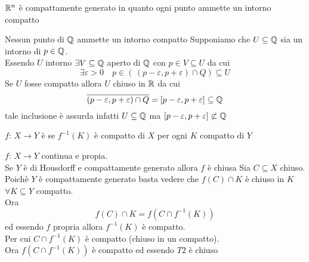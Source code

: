 \begin{oss}$\mathbb{R}^n$ \`e compattamente generato in quanto ogni punto ammette un intorno compatto
\end{oss}
\begin{ex}Nessun punto di $\mathbb{Q}$ ammette un intorno compatto
\proof Supponiamo che $U \subseteq \mathbb{Q} $ sia un intorno di $p\in \mathbb{Q}$.\\
Essendo $U$ intorno $\exists V\subseteq \mathbb{Q}$ aperto di $\mathbb{Q}$ con $p\in V \subseteq U $ da cui 
$$ \exists \varepsilon>0 \quad p \in \left( \, (p-\varepsilon, p+\varepsilon) \cap Q \right) \subseteq U$$
Se $U$ fosse compatto allora $U$ chiuso in $\mathbb{R}$ da cui 
$$\overline{(p-\varepsilon, p+\varepsilon) \cap Q } = [p-\varepsilon,p+\varepsilon] \subseteq \mathbb{Q}$$
tale inclusione \`e assurda infatti $U \subseteq \mathbb{Q} $ ma $[p-\varepsilon , p+\varepsilon ] \not \subset \mathbb{Q}$
\end{ex}
\spazio
\begin{defn}$f:\, X\to Y$ \`e  se $f^{-1}(K)$ \`e compatto di $X$ per ogni $K$ compatto di $Y$
\end{defn}
\begin{thm}$f:\, X \to Y$ continua e propia.\\
Se $Y$ \`e di Housdorff e compattamente generato allora $f$ \`e chiusa
\proof Sia $C\subseteq X $ chiuso.\\
Poich\`e $Y$ \`e compattamente generato basta vedere che $f(C)\cap K $ \`e chiuso in $K$ $\forall K\subseteq Y $ compatto.\\
Ora
$$ f(C) \cap K = f\left(C\cap f^{-1}(K) \right)$$
ed essendo $f$ propria allora $f^{-1}(K)$ \`e compatto.\\
Per cui $C \cap f^{-1}(K)$ \`e compatto (chiuso in un compatto).\\
Ora $f \left( C \cap f^{-1}(K) \right) $ \`e compatto ed essendo $T2$ \`e chiuso
\endproof
\end{thm}
	